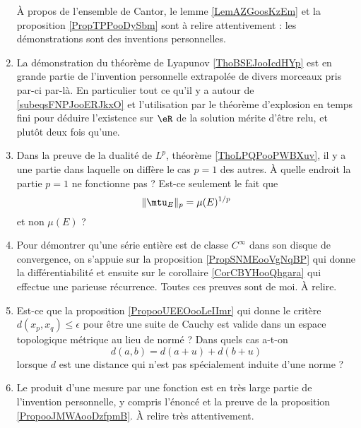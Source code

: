 \begin{enumerate}
        À propos de l'ensemble de Cantor, le lemme \ref{LemAZGoosKzEm} et la proposition \ref{PropTPPooDySbm} sont à relire attentivement : les démonstrations sont des inventions personnelles.

    \item

        La démonstration du théorème de Lyapunov \ref{ThoBSEJooIcdHYp} est en grande partie de l'invention personnelle extrapolée de divers morceaux pris par-ci par-là. En particulier tout ce qu'il y a autour de \eqref{subeqsFNPJooERJkxO} et l'utilisation par le théorème d'explosion en temps fini pour déduire l'existence sur \( \eR\) de la solution mérite d'être relu, et plutôt deux fois qu'une.

    \item

        Dans la preuve de la dualité de \( L^p\), théorème \ref{ThoLPQPooPWBXuv}, il y a une partie dans laquelle on diffère le cas \( p= 1\) des autres. À quelle endroit la partie \( p=1\) ne fonctionne pas ? Est-ce seulement le fait que
        \begin{equation}
            \| \mtu_E \|_p=\mu(E)^{1/p} 
        \end{equation}
        et non \( \mu(E)\) ?

    \item
        Pour démontrer qu'une série entière est de classe \(  C^{\infty}\) dans son disque de convergence, on s'appuie sur la proposition \ref{PropSNMEooVgNqBP} qui donne la différentiabilité et ensuite sur le corollaire \ref{CorCBYHooQhgara} qui effectue une parieuse récurrence. Toutes ces preuves sont de moi. À relire.
    \item
        Est-ce que la proposition \ref{PropooUEEOooLeIImr} qui donne le critère \( d(x_p,x_q)\leq \epsilon\) pour être une suite de Cauchy est valide dans un espace topologique métrique au lieu de normé ?  Dans quels cas a-t-on
        \begin{equation}
            d(a,b)=d(a+u)+d(b+u) 
        \end{equation}
        lorsque \( d\) est une distance qui n'est pas spécialement induite d'une norme ?
    \item
        Le produit d'une mesure par une fonction est en très large partie de l'invention personnelle, y compris l'énoncé et la preuve de la proposition \ref{PropooJMWAooDzfpmB}. À relire très attentivement.
\end{enumerate}

